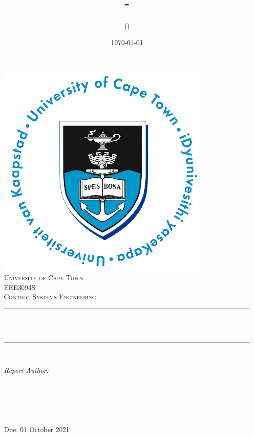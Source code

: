 \documentclass[12pt]{article}
\title{\reportName - \reportTopic}	%
\author{\authorFullName (\authorStudentNumber)}	%
\date{\today}									%
\makeatletter
\newcommand{\courseName}{EEE3094S\xspace}
\newcommand{\courseTitle}{Control Systems Engineering\xspace}
\newcommand{\dueDate}{01 October 2021\xspace}
\let\thetitle\@title
\let\theauthor\@author
\makeatother
\begin{document}

\begin{titlepage}
	\centering
    \vspace*{0.5 cm}
    \includegraphics[scale = 0.75]{UCT.jpg}\\[1.0 cm]	%
    \textsc{\LARGE University of Cape Town}\\[2.0 cm]	%
	\textsc{\Large \courseName}\\[0.5 cm]				%
	\textsc{\large \courseTitle}\\[0.5 cm]	%
	\rule{\linewidth}{0.2 mm} \\[0.4 cm]
	{ \huge \bfseries \thetitle}\\
	\rule{\linewidth}{0.2 mm} \\[1.5 cm]
	
	\begin{minipage}{0.4\textwidth}
		\begin{flushleft} \large
			\emph{Report Author:}
			\end{flushleft}
			\end{minipage}~
			\begin{minipage}{0.4\textwidth}
			\begin{flushright} \large
			\emph{\theauthor} \\
		\end{flushright}
	\end{minipage}\\[4 cm]
	
	{\large Due: \dueDate}\\[2 cm]
 
	\vfill
	
\end{titlepage}
\end{document}

